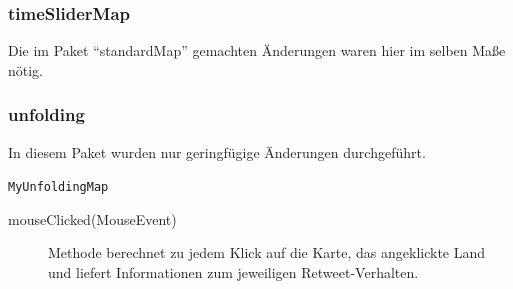\subsubsection{timeSliderMap}
Die im Paket "`standardMap"' gemachten Änderungen waren hier im selben Maße nötig.

\subsubsection{unfolding} 
In diesem Paket wurden nur geringfügige Änderungen durchgeführt.
\begin{description}
	\item \lstinline{MyUnfoldingMap}
	\begin{description}
			\item[mouseClicked(MouseEvent)] Methode berechnet zu jedem Klick auf die Karte, das angeklickte Land und liefert Informationen zum jeweiligen Retweet-Verhalten.
	\end{description}
\end{description}
	